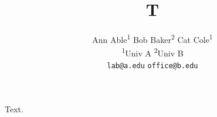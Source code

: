 \documentclass{article}
\title{T}
\author{\begin{tabular}{c}
Ann Able\textsuperscript{1} \quad Bob Baker\textsuperscript{2} \quad Cat Cole\textsuperscript{1} \\
\textsuperscript{1}Univ A \quad \textsuperscript{2}Univ B \\
\texttt{lab@a.edu} \quad \texttt{office@b.edu}
\end{tabular}}
\begin{document}
\maketitle
Text.
\end{document}
